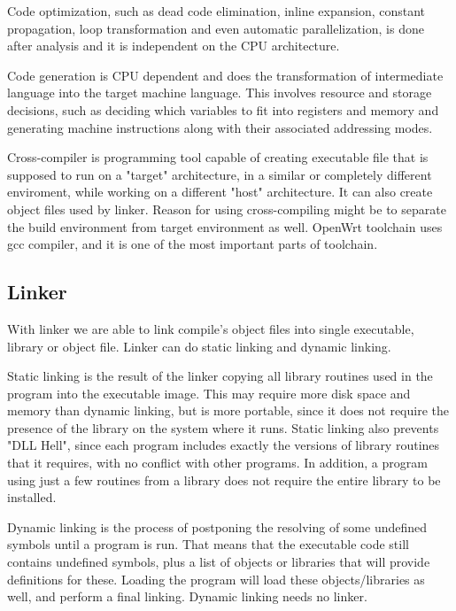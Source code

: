 Code optimization, such as dead code elimination, inline expansion, constant propagation, loop transformation and even automatic parallelization, is done after analysis and it is independent on the CPU architecture.

Code generation is CPU dependent and does the transformation of intermediate language into the target machine language.
This involves resource and storage decisions, such as deciding which variables to fit into registers and memory and generating machine instructions along with their associated addressing modes.

Cross-compiler is programming tool capable of creating executable file that is supposed to run on a "target" architecture, in a similar or completely different enviroment, while working on a different "host" architecture.
It can also create object files used by linker.
Reason for using cross-compiling might be to separate the build environment from target environment as well.
OpenWrt toolchain uses gcc compiler, and it is one of the most important parts of toolchain\cite{compiler}.



\subsection{Linker}

With linker we are able to link compile's object files into single executable, library or object file.
Linker can do static linking and dynamic linking.

Static linking is the result of the linker copying all library routines used in the program into the executable image.
This may require more disk space and memory than dynamic linking, but is more portable, since it does not require the presence of the library on the system where it runs.
Static linking also prevents "DLL Hell", since each program includes exactly the versions of library routines that it requires, with no conflict with other programs. In addition, a program using just a few routines from a library does not require the entire library to be installed.

Dynamic linking is the process of postponing the resolving of some undefined symbols until a program is run.
That means that the executable code still contains undefined symbols, plus a list of objects or libraries that will provide definitions for these.
Loading the program will load these objects/libraries as well, and perform a final linking.
Dynamic linking needs no linker.

